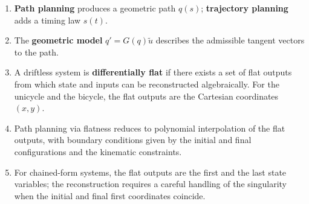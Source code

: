 \begin{enumerate}
    \item \textbf{Path planning} produces a geometric path
          \( q(s) \); \textbf{trajectory planning} adds a timing law
          \( s(t) \).
    \item The \textbf{geometric model} \( q' = G(q) \tilde{u} \) describes
          the admissible tangent vectors to the path.
    \item A driftless system is \textbf{differentially flat} if there
          exists a set of flat outputs from which state and inputs can
          be reconstructed algebraically. For the unicycle and the
          bicycle, the flat outputs are the Cartesian coordinates
          \( (x, y) \).
    \item Path planning via flatness reduces to polynomial interpolation
          of the flat outputs, with boundary conditions given by the
          initial and final configurations and the kinematic
          constraints.
    \item For chained-form systems, the flat outputs are the first and
          the last state variables; the reconstruction requires a
          careful handling of the singularity when the initial and
          final first coordinates coincide.
\end{enumerate}